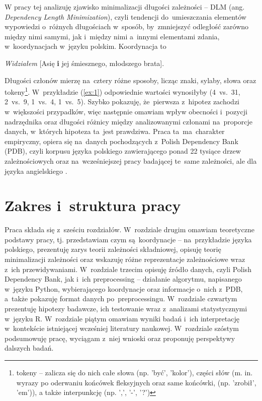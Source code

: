 \documentclass[licencjacka]{pracamgr_Kogni}
\begin{document}
W pracy tej analizuję zjawisko minimalizacji długości zależności -- DLM (ang. \textit{Dependency Length Minimization}), czyli tendencji do~umieszczania elementów wypowiedzi o~różnych długościach w~sposób, by~zmniejszyć odległość zarówno między nimi samymi, jak i~między nimi a~innymi elementami zdania, w~koordynacjach w~języku polskim. Koordynacja to
\begin{exe}
    \ex
    \textit{Widziałem} [Asię \textbf{i} jej śmiesznego, młodszego brata]. 
    \label {ex:1}
\end{exe}
Długości członów mierzę na~cztery różne sposoby, licząc znaki, sylaby, słowa oraz tokeny\footnote{tokeny -- zalicza się do nich całe słowa (np. 'być', 'kolor'), części słów (m. in. wyrazy po oderwaniu końcówek fleksyjnych oraz same końcówki, (np. 'zrobił', 'em')), a także interpunkcję (np. ',', '-', '?')}. W~przykładzie (\ref{ex:1}) odpowiednie wartości wynosiłyby (4~vs.~31, 2~vs.~9, 1~vs.~4, 1~vs.~5). Szybko pokazuję, że~pierwsza z~hipotez zachodzi w~większości przypadków, więc następnie omawiam wpływ obecności i~pozycji nadrzędnika oraz długości różnicy między analizowanymi członami na~proporcje danych, w~których hipoteza ta~jest prawdziwa. Praca ta~ma~charakter empiryczny, opiera się na~danych pochodzących z~Polish Dependency Bank (PDB), czyli korpusu języka polskiego zawierającego ponad 22 tysiące drzew zależnościowych oraz na~wcześniejszej pracy badającej te~same zależności, ale dla języka angielskiego \citep{Przepiorkowski2023}.

\section{Zakres i~struktura pracy}
Praca składa się z~sześciu rozdziałów. W~rozdziale drugim omawiam teoretyczne podstawy pracy, tj. przedstawiam czym są~koordynacje -- na~przykładzie języka polskiego, prezentuję zarys teorii zależności składniowej, opisuję teorię minimalizacji zależności oraz wskazuję różne reprezentacje zależnościowe wraz z~ich przewidywaniami. W~rozdziale trzecim opisuję źródło danych, czyli Polish Dependency Bank, jak i~ich preprocessing -- działanie algorytmu, napisanego w~języku Python, wybierającego koordynacje oraz informacje o~nich z~PDB, a~także pokazuję format danych po~preprocessingu. W~rozdziale czwartym prezentuję hipotezy badawcze, ich testowanie wraz z~analizami statystycznymi w~języku R. W~rozdziale piątym omawiam wyniki badań i~ich interpretację w~kontekście istniejącej wcześniej literatury naukowej. W~rozdziale szóstym podsumowuję pracę, wyciągam z~niej wnioski oraz proponuję perspektywy dalszych badań.
\end{document}
